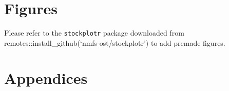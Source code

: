 \documentclass[
  letterpaper,
]{article}
\begin{document}
\endgroup

\clearpage

\newpage{}

\section{Figures}\label{sec-figures}

Please refer to the \texttt{stockplotr} package downloaded from
remotes::install\_github(`nmfs-ost/stockplotr') to add premade figures.

\newpage{}

\appendix
\setcounter{figure}{0}
\setcounter{table}{0}

\section{Appendices}\label{sec-appendix}
\end{document}

